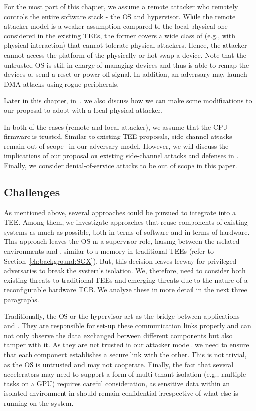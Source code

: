 For the most part of this chapter, we assume a remote attacker who remotely controls the entire software stack - the OS and hypervisor. While the remote attacker model is a weaker assumption compared to the local physical one considered in the existing TEEs, the former covers a wide class of \sphw (e.g., \sphw with physical interaction) that cannot tolerate physical attackers. Hence, the attacker cannot access the platform of the \sphw physically or hot-swap a device. Note that the untrusted OS is still in charge of managing \sphw devices and thus is able to remap the devices or send a reset or power-off signal. In addition, an adversary may launch DMA attacks using rogue peripherals.

Later in this chapter, in~, we also discuss how we can make some modifications to our proposal to adopt with a local physical attacker. 

In both of the cases (remote and local attacker), we assume that the CPU firmware is trusted. Similar to existing TEE proposals, side-channel attacks remain out of scope~\cite{costan2016intel} in our adversary model. However, we will discuss the implications of our proposal on existing side-channel attacks and defenses in . Finally, we consider denial-of-service attacks to be out of scope in this paper. 



\subsection{Challenges}
\label{pue:sec:problemStatement:challenges}

As mentioned above, several approaches could be pursued to integrate \sphw into a TEE. Among them, we investigate approaches that reuse components of existing systems as much as possible, both in terms of software and in terms of hardware.  
This approach leaves the OS in a supervisor role, liaising between the isolated environments and \sphw, similar to a memory in traditional TEEs (refer to  Section~\ref{ch:background:SGX}). But, this decision leaves leeway for privileged adversaries to break the system's isolation. We, therefore, need to consider both existing threats to traditional TEEs and emerging threats due to the nature of a reconfigurable hardware TCB. 
We analyze these in more detail in the next three paragraphs.


Traditionally, the OS or the hypervisor act as the bridge between applications and \sphw. They are responsible for set-up these communication links properly and can not only observe the data exchanged between different components but also tamper with it. As they are not trusted in our attacker model, we need to ensure that each component establishes a secure link with the other. This is not trivial, as the OS is untrusted and may not cooperate. 
Finally, the fact that several accelerators may need to support a form of multi-tenant isolation (e.g., multiple tasks on a GPU) requires careful consideration, as sensitive data within an isolated environment in \name should remain confidential irrespective of what else is running on the system.



